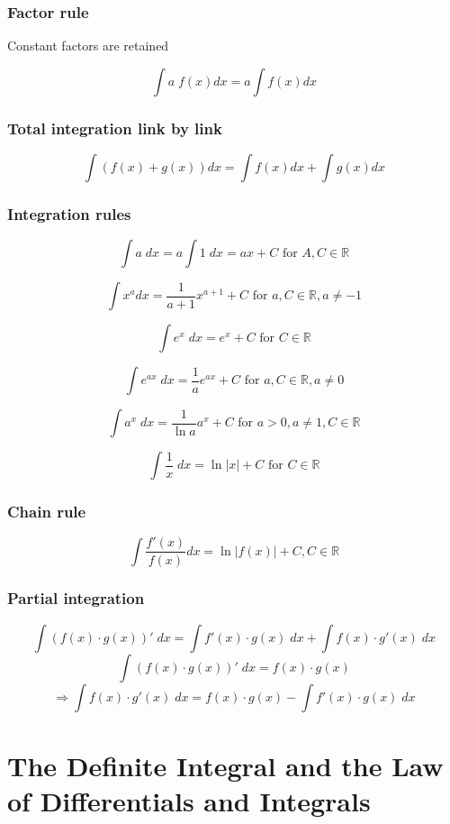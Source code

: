 \documentclass{book}
\begin{document}
\subsubsection{Factor rule}

Constant factors are retained

\[
  \int a \; f(x)dx = a \int f(x)dx
\]

\subsubsection{Total integration link by link}

\[
  \int (f(x) + g(x))dx = \int f(x)dx + \int g(x)dx
\]

\subsubsection{Integration rules}

\[
  \int a \; dx = a \int 1 \; dx = ax + C \text{ for } A, C  \in \mathbb{R} 
\]

\[
  \int x^adx = \frac{1}{a+1}x^{a+1} + C \text{ for } a, C \in \mathbb{R}, a \ne -1
\]

\[
  \int e^x \; dx = e^x + C \text{ for } C \in \mathbb{R}
\]

\[
  \int e^{ax} \; dx = \frac{1}{a}e^{ax} + C \text{ for } a, C \in \mathbb{R}, a \ne 0
\]

\[
  \int a^x \; dx = \frac{1}{\ln a}a^x + C \text{ for } a > 0, a \ne 1, C \in \mathbb{R}
\]

\[
  \int \frac{1}{x}\; dx = \ln |x| + C \text{ for } C \in\mathbb{R}
\]

\subsubsection{Chain rule}
\[
  \int \frac{f'(x)}{f(x)}dx = \ln|f(x)| + C, C \in \mathbb{R}
\]

\subsubsection{Partial integration}
\[
  \int (f(x) \cdot g(x))'\; dx = \int f'(x) \cdot g(x) \; dx + \int f(x) \cdot g'(x) \; dx
\]
\[
  \int (f(x) \cdot g(x))' \; dx = f(x) \cdot g(x)
\]
\[
  \Longrightarrow \int f(x) \cdot g'(x)\; dx = f(x) \cdot g(x) - \int f'(x) \cdot g(x) \; dx
\]


\section{The Definite Integral and the Law of Differentials and Integrals}
\end{document}
